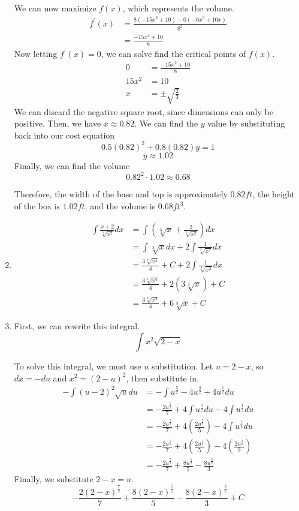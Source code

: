 \documentclass[11pt, letterpaper, twoside]{article}
\begin{document}
\begin{enumerate}
We can now maximize \(f(x)\), which represents the volume.
\begin{align*}
f^\prime(x)&=\frac{8(-15x^2+10)-0(-6x^3+10x)}{8^2}\\
&=\frac{-15x^2+10}{8}
\end{align*}
Now letting \(f^\prime(x)=0\), we can solve find the critical points of \(f(x)\).
\begin{align*}
0&=\frac{-15x^2+10}{8}\\
15x^2&=10\\
x&=\pm \sqrt{\frac{2}{3}}
\end{align*}
We can discard the negative square root, since dimensions can only be positive. Then, we have \(x\approx0.82\).
We can find the \(y\) value by substituting back into our cost equation 
\[0.5(0.82)^2+0.8(0.82)y=1\]
\[y\approx1.02\]
Finally, we can find the volume
\[0.82^2\cdot1.02\approx0.68\]

Therefore, the width of the base and top is approximately $0.82 ft$, the height of the box is $1.02 ft$, and the volume is $0.68ft^3$.
\item \begin{align*}
\int \frac{x+2}{\sqrt[3]{x^2}}dx&=\int \left(\sqrt[3]{x}+\frac{2}{\sqrt[3]{x^2}}\right)dx\\
&=\int \sqrt[3]{x}dx+2\int\frac{1}{\sqrt[3]{x^2}}dx\\
&= \frac{3\sqrt[3]{x^4}}{4}+C+2\int\frac{1}{\sqrt[3]{x^2}}dx\\
&= \frac{3\sqrt[3]{x^4}}{4}+2(3\sqrt[3]x)+C\\
&= \boxed{\frac{3\sqrt[3]{x^4}}{4}+6\sqrt[3]x+C}
\end{align*}

\item %
First, we can rewrite this integral.
\[\int x^2\sqrt{2-x}\]

To solve this integral, we must use \(u\) substitution. 
Let \(u=2-x\), so \(dx=-du\) and \(x^2=(2-u)^2\), then substitute in.
\begin{align*}
-\int(u-2)^2\sqrt u du &= -\int u^{\frac{5}{2}}-4u^{\frac{3}{2}}+4u^{\frac{1}{2}}du\\
&=-\frac{2u^{\frac{7}{2}}}{7}+4\int u^{\frac{3}{2}}du-4\int u^{\frac{1}{2}}du \\
&=-\frac{2u^{\frac{7}{2}}}{7}+4\left(\frac{2u^{\frac{5}{2}}}{5}\right)-4\int u^{\frac{1}{2}}du\\
&=-\frac{2u^{\frac{7}{2}}}{7}+4\left(\frac{2u^{\frac{5}{2}}}{5}\right)-4\left(\frac{2u^{\frac{3}{2}}}{3}\right)\\
&=-\frac{2u^{\frac{7}{2}}}{7}+\frac{8u^{\frac{5}{2}}}{5}-\frac{8u^{\frac{3}{2}}}{3}
\end{align*}
Finally, we substitute \(2-x=u\).
\[\boxed{-\frac{2(2-x)^{\frac{7}{2}}}{7}+\frac{8(2-x)^{\frac{5}{2}}}{5}-\frac{8(2-x)^{\frac{3}{2}}}{3}+C}\]


\end{enumerate}
\end{document}
